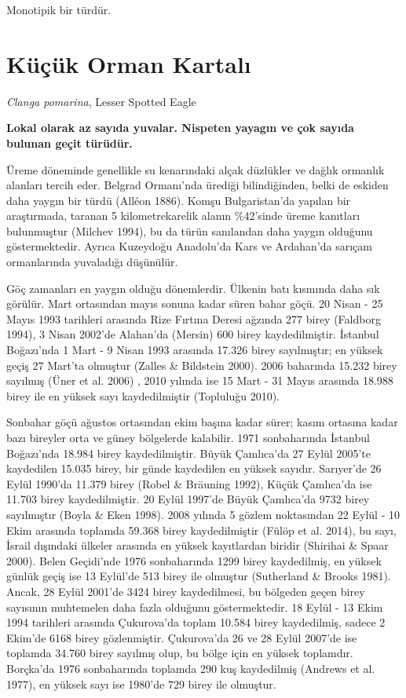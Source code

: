 \documentclass[
  letterpaper,
  DIV=11,
  numbers=noendperiod]{scrreprt}
\begin{document}
Monotipik bir türdür.

\section{Küçük Orman Kartalı}\label{kuxfcuxe7uxfck-orman-kartalux131}

\emph{Clanga pomarina}, Lesser Spotted Eagle

\textbf{Lokal olarak az sayıda yuvalar. Nispeten yayagın ve çok sayıda
bulunan geçit türüdür.}

Üreme döneminde genellikle su kenarındaki alçak düzlükler ve dağlık
ormanlık alanları tercih eder. Belgrad Ormanı'nda ürediği bilindiğinden,
belki de eskiden daha yaygın bir türdü (Alléon 1886). Komşu
Bulgaristan'da yapılan bir araştırmada, taranan 5 kilometrekarelik
alanın \%42'sinde üreme kanıtları bulunmuştur (Milchev 1994), bu da
türün sanılandan daha yaygın olduğunu göstermektedir. Ayrıca Kuzeydoğu
Anadolu'da Kars ve Ardahan'da sarıçam ormanlarında yuvaladığı düşünülür.

Göç zamanları en yaygın olduğu dönemlerdir. Ülkenin batı kısmında daha
sık görülür. Mart ortasından mayıs sonuna kadar süren bahar göçü. 20
Nisan - 25 Mayıs 1993 tarihleri arasında Rize Fırtına Deresi ağzında 277
birey (Faldborg 1994), 3 Nisan 2002'de Alahan'da (Mersin) 600 birey
kaydedilmiştir. İstanbul Boğazı'nda 1 Mart - 9 Nisan 1993 arasında
17.326 birey sayılmıştır; en yüksek geçiş 27 Mart'ta olmuştur (Zalles \&
Bildstein 2000). 2006 baharında 15.232 birey sayılmış (Üner et al. 2006)
, 2010 yılında ise 15 Mart - 31 Mayıs arasında 18.988 birey ile en
yüksek sayı kaydedilmiştir (Topluluğu 2010).

Sonbahar göçü ağustos ortasından ekim başına kadar sürer; kasım ortasına
kadar bazı bireyler orta ve güney bölgelerde kalabilir. 1971
sonbaharında İstanbul Boğazı'nda 18.984 birey kaydedilmiştir. Büyük
Çamlıca'da 27 Eylül 2005'te kaydedilen 15.035 birey, bir günde
kaydedilen en yüksek sayıdır. Sarıyer'de 26 Eylül 1990'da 11.379 birey
(Robel \& Bräuning 1992), Küçük Çamlıca'da ise 11.703 birey
kaydedilmiştir. 20 Eylül 1997'de Büyük Çamlıca'da 9732 birey sayılmıştır
(Boyla \& Eken 1998). 2008 yılında 5 gözlem noktasından 22 Eylül - 10
Ekim arasında toplamda 59.368 birey kaydedilmiştir (Fülöp et al. 2014),
bu sayı, İsrail dışındaki ülkeler arasında en yüksek kayıtlardan biridir
(Shirihai \& Spaar 2000). Belen Geçidi'nde 1976 sonbaharında 1299 birey
kaydedilmiş, en yüksek günlük geçiş ise 13 Eylül'de 513 birey ile
olmuştur (Sutherland \& Brooks 1981). Ancak, 28 Eylül 2001'de 3424 birey
kaydedilmesi, bu bölgeden geçen birey sayısının muhtemelen daha fazla
olduğunu göstermektedir. 18 Eylül - 13 Ekim 1994 tarihleri arasında
Çukurova'da toplam 10.584 birey kaydedilmiş, sadece 2 Ekim'de 6168 birey
gözlenmiştir. Çukurova'da 26 ve 28 Eylül 2007'de ise toplamda 34.760
birey sayılmış olup, bu bölge için en yüksek toplamdır. Borçka'da 1976
sonbaharında toplamda 290 kuş kaydedilmiş (Andrews et al. 1977), en
yüksek sayı ise 1980'de 729 birey ile olmuştur.
\end{document}
